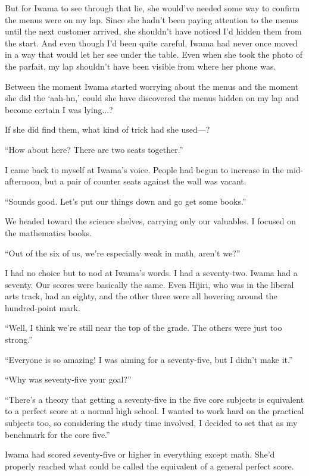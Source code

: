 \documentclass[
    a4paper,
    12pt,
    twoside,
    openany,
    UTF8,
    fontset=windows
]{ctexbook}
\begin{document}
But for Iwama to see through that lie, she would've needed some way to confirm the menus were on my lap. Since she hadn't been paying attention to the menus until the next customer arrived, she shouldn't have noticed I'd hidden them from the start. And even though I'd been quite careful, Iwama had never once moved in a way that would let her see under the table. Even when she took the photo of the parfait, my lap shouldn't have been visible from where her phone was.

Between the moment Iwama started worrying about the menus and the moment she did the `aah-hn,' could she have discovered the menus hidden on my lap and become certain I was lying...?

If she did find them, what kind of trick had she used---?

``How about here? There are two seats together.''

I came back to myself at Iwama's voice. People had begun to increase in the mid-afternoon, but a pair of counter seats against the wall was vacant.

``Sounds good. Let's put our things down and go get some books.''

We headed toward the science shelves, carrying only our valuables. I focused on the mathematics books.

``Out of the six of us, we're especially weak in math, aren't we?''

I had no choice but to nod at Iwama's words. I had a seventy-two. Iwama had a seventy. Our scores were basically the same. Even Hijiri, who was in the liberal arts track, had an eighty, and the other three were all hovering around the hundred-point mark.

``Well, I think we're still near the top of the grade. The others were just too strong.''

``Everyone is so amazing! I was aiming for a seventy-five, but I didn't make it.''

``Why was seventy-five your goal?''

``There's a theory that getting a seventy-five in the five core subjects is equivalent to a perfect score at a normal high school. I wanted to work hard on the practical subjects too, so considering the study time involved, I decided to set that as my benchmark for the core five.''

Iwama had scored seventy-five or higher in everything except math. She'd properly reached what could be called the equivalent of a general perfect score.
\end{document}
